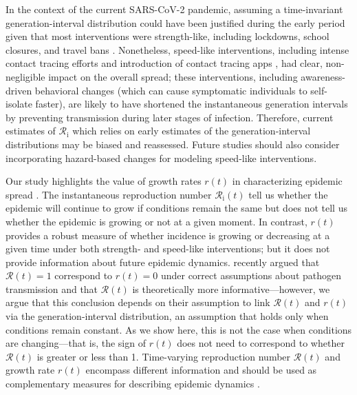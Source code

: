 \documentclass[12pt]{article}
\newcommand{\Rx}[1]{\ensuremath{{\mathcal R}_{#1}}\xspace}
\newcommand{\Ri}{\Rx{\mathrm{i}}}
\newcommand{\RR}{\ensuremath{{\mathcal R}}\xspace}
\begin{document}
In the context of the current SARS-CoV-2 pandemic, assuming a time-invariant generation-interval distribution could have been justified during the early period given that most interventions were strength-like, including lockdowns, school closures, and travel bans \citep{flaxman2020estimating,li2021temporal,brauner2021inferring}.
Nonetheless, speed-like interventions, including intense contact tracing efforts \citep{park2020contact} and introduction of contact tracing apps \citep{wymant2021introduction}, had clear, non-negligible impact on the overall spread;
these interventions, including awareness-driven behavioral changes (which can cause symptomatic individuals to self-isolate faster), are likely to have shortened the instantaneous generation intervals by preventing transmission during later stages of infection.
Therefore, current estimates of $\Ri$ which relies on early estimates of the generation-interval distributions may be biased and reassessed.
Future studies should also consider incorporating hazard-based changes for modeling speed-like interventions.

Our study highlights the value of growth rates $r(t)$ in characterizing epidemic spread \citep{abbott2020temporal,anderson2020reproduction}.
The instantaneous reproduction number $\Ri(t)$ tell us whether the epidemic will continue to grow if conditions remain the same but does not tell us whether the epidemic is growing or not at a given moment.
In contrast, $r(t)$ provides a robust measure of whether incidence is growing or decreasing at a given time under both strength- and speed-like interventions;
but it does not provide information about future epidemic dynamics.
\cite{parag2021epidemic} recently argued that $\RR(t)=1$ correspond to $r(t) = 0$ under correct assumptions about pathogen transmission and that $\RR(t)$ is theoretically more informative---however, we argue that this conclusion depends on their assumption to link $\RR(t)$ and $r(t)$ via the generation-interval distribution, an assumption that holds only when conditions remain constant.
As we show here, this is not the case when conditions are changing---that is, the sign of $r(t)$ does not need to correspond to whether $\RR(t)$ is greater or less than 1.
Time-varying reproduction number $\RR(t)$ and growth rate $r(t)$ encompass different information and should be used as complementary measures for describing epidemic dynamics \citep{dushoff2021speed}.
\end{document}
